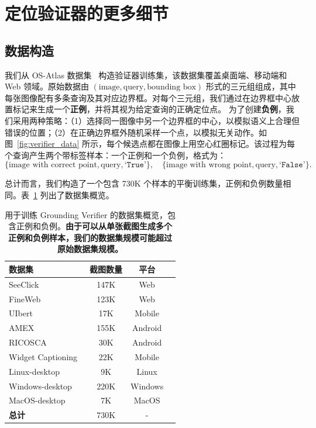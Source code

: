 \documentclass{article}
\begin{document}
\section{定位验证器的更多细节}
\subsection{数据构造}
\label{appendix:data_verifier}
我们从 OS-Atlas 数据集~\cite{wu2024atlas} 构造验证器训练集，该数据集覆盖桌面端、移动端和 Web 领域。原始数据由 $(\text{image}, \text{query}, \text{bounding box})$ 形式的三元组组成，其中每张图像配有多条查询及其对应边界框。对每个三元组，我们通过在边界框中心放置标记来生成一个\textbf{正例}，并将其视为给定查询的正确定位点。
为了创建\textbf{负例}，我们采用两种策略：（1）选择同一图像中另一个边界框的中心，以模拟语义上合理但错误的位置；（2）在正确边界框外随机采样一个点，以模拟无关动作。如图~\ref{fig:verifier_data} 所示，每个候选点都在图像上用空心红圈标记。该过程为每个查询产生两个带标签样本：一个正例和一个负例，格式为：
\[
\{\text{image with correct point}, \text{query}, \texttt{`True'}\}, \quad \{\text{image with wrong point}, \text{query}, \texttt{`False'}\} .
\]

总计而言，我们构造了一个包含 730K 个样本的平衡训练集，正例和负例数量相同。表~\ref{tab:train-data-verifier} 列出了数据集概览。

\begin{table}[h]
\centering
\small
\caption{用于训练 Grounding Verifier 的数据集概览，包含正例和负例。\textbf{由于可以从单张截图生成多个正例和负例样本，我们的数据集规模可能超过原始数据集规模。}}
\label{tab:train-data-verifier}
\begin{tabular}{lccc}
\toprule
\textbf{数据集} &  \textbf{截图数量} & \textbf{平台} \\
\midrule
SeeClick~\citep{cheng2024seeclick}     & 147K  & Web \\
FineWeb~\citep{penedo2024fineweb}     & 123K  & Web \\
UIbert~\citep{bai2021uibert}       & 17K   & Mobile \\
AMEX~\citep{chai2024amex}            & 155K    & Android \\
RICOSCA~\citep{li2020mapping}          & 30K    & Android \\
Widget Captioning~\citep{li2020widget}  &  22K  &  Mobile \\
Linux-desktop~\citep{wu2024atlas}  &    9K    &    Linux \\
Windows-desktop~\citep{wu2024atlas} &  220K & Windows \\
MacOS-desktop~\citep{wu2024atlas} & 7K   & MacOS \\
\midrule
\textbf{总计}         & 730K  & - \\
\bottomrule
\end{tabular}
\end{table}
\end{document}
